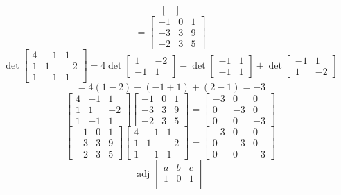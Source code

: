 \begin{itemize}
$$\begin{bmatrix}
\end{bmatrix}$$
$$= \begin{bmatrix}
-1 & 0 & 1 \\
-3 & 3 & 9 \\
-2 & 3 & 5
\end{bmatrix}$$
$$\det\begin{bmatrix}
4 & -1 & 1 \\
1 & 1 & -2 \\
1 & -1 & 1
\end{bmatrix} = 4\det\begin{bmatrix}
1 & -2 \\
-1 & 1
\end{bmatrix} - \det\begin{bmatrix}
-1 & 1 \\
-1 & 1
\end{bmatrix} + \det\begin{bmatrix}
-1 & 1 \\
1 & -2
\end{bmatrix} $$
$$= 4(1 - 2) - (-1 + 1) + (2 - 1) = -3$$
$$\begin{bmatrix}
4 & -1 & 1 \\
1 & 1 & -2 \\
1 & -1 & 1
\end{bmatrix}\begin{bmatrix}
-1 & 0 & 1 \\
-3 & 3 & 9 \\
-2 & 3 & 5
\end{bmatrix} = \begin{bmatrix}
-3 & 0 & 0 \\
0 & -3 & 0 \\
0 & 0 & -3
\end{bmatrix}$$
$$\begin{bmatrix}
-1 & 0 & 1 \\
-3 & 3 & 9 \\
-2 & 3 & 5
\end{bmatrix}\begin{bmatrix}
4 & -1 & 1 \\
1 & 1 & -2 \\
1 & -1 & 1
\end{bmatrix} = \begin{bmatrix}
-3 & 0 & 0 \\
0 & -3 & 0 \\
0 & 0 & -3
\end{bmatrix}$$
$$\text{adj }\begin{bmatrix}
a & b & c \\
1 & 0 & 1 \\

\end{bmatrix}$$
\end{itemize}
